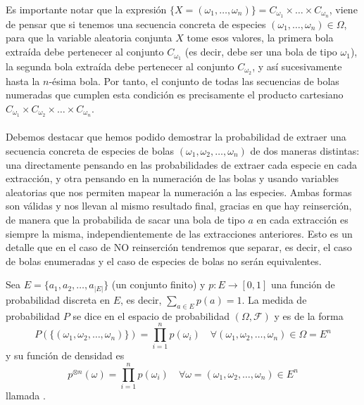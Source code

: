 \noindent
Es importante notar que la expresión $\{X=(\omega_1, \ldots, \omega_n)\} = C_{\omega_1} \times \ldots \times C_{\omega_n}$, viene de pensar que si tenemos una secuencia concreta de especies $(\omega_1, \ldots, \omega_n) \in \Omega$, para que la variable aleatoria conjunta $X$ tome esos valores, la primera bola extraída debe pertenecer al conjunto $C_{\omega_1}$ (es decir, debe ser una bola de tipo $\omega_1$), la segunda bola extraída debe pertenecer al conjunto $C_{\omega_2}$, y así sucesivamente hasta la $n$-ésima bola. Por tanto, el conjunto de todas las secuencias de bolas numeradas que cumplen esta condición es precisamente el producto cartesiano $C_{\omega_1} \times C_{\omega_2} \times \ldots \times C_{\omega_n}$. \\ \\ 
\noindent
Debemos destacar que hemos podido demostrar la probabilidad de extraer una secuencia concreta de especies de bolas $(\omega_1, \omega_2, \ldots, \omega_n)$ de dos maneras distintas: una directamente pensando en las probabilidades de extraer cada especie en cada extracción, y otra pensando en la numeración de las bolas y usando variables aleatorias que nos permiten mapear la numeración a las especies. Ambas formas son válidas y nos llevan al mismo resultado final, gracias en que hay reinserción, de manera que la probabilida de sacar una bola de tipo $a$ en cada extracción es siempre la misma, independientemente de las extracciones anteriores. Esto es un detalle que en el caso de NO reinserción tendremos que separar, es decir, el caso de bolas enumeradas y el caso de especies de bolas no serán equivalentes. \\ 

\begin{definicion}
    Sea $E=\{a_1, a_2, \ldots, a_{|E|}\}$ (un conjunto finito) y $p:E\to [0,1]$ una función de probabilidad discreta en $E$, es decir, $\sum_{a\in E} p(a) = 1$. La medida de probabilidad $P$ se dice  en el espacio de probabilidad $(\Omega, \mathcal{F})$ y es de la forma
    \begin{equation*}
        P(\{(\omega_1, \omega_2, \ldots, \omega_n)\}) = \prod_{i=1}^n p(\omega_i) \quad \forall (\omega_1, \omega_2, \ldots, \omega_n) \in \Omega = E^n
    \end{equation*}
    y su función de densidad es 
    \begin{equation*}
        p^{\otimes n}(\omega) = \prod_{i=1}^n p(\omega_i) \quad \forall \omega=(\omega_1, \omega_2, \ldots, \omega_n) \in E^n
    \end{equation*}
    llamada .
\end{definicion}

